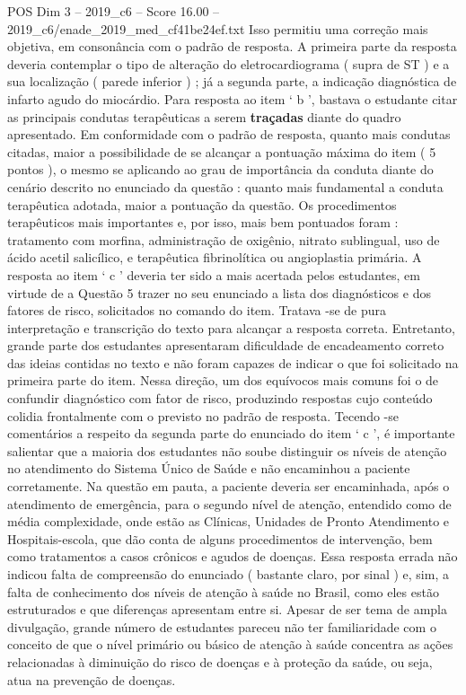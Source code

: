 \begin{textsample}{POS Dim 3 – 2019\_c6 – Score 16.00 – 2019\_c6/enade\_2019\_med\_cf41be24ef.txt}
Isso permitiu uma correção mais objetiva, em consonância com o padrão de resposta.
A primeira parte da resposta deveria contemplar o tipo de alteração do eletrocardiograma ( supra de ST ) e a sua localização ( parede inferior ) ; já a segunda parte, a indicação diagnóstica de infarto agudo do miocárdio.
Para resposta ao item ‘ b ’, bastava o estudante citar as principais condutas terapêuticas a serem \textbf{traçadas} diante do quadro apresentado.
Em conformidade com o padrão de resposta, quanto mais condutas citadas, maior a possibilidade de se alcançar a pontuação máxima do item ( 5 pontos ), o mesmo se aplicando ao grau de importância da conduta diante do cenário descrito no enunciado da questão : quanto mais fundamental a conduta terapêutica adotada, maior a pontuação da questão.
Os procedimentos terapêuticos mais importantes e, por isso, mais bem pontuados foram : tratamento com morfina, administração de oxigênio, nitrato sublingual, uso de ácido acetil salicílico, e terapêutica fibrinolítica ou angioplastia primária.
A resposta ao item ‘ c ’ deveria ter sido a mais acertada pelos estudantes, em virtude de a Questão 5 trazer no seu enunciado a lista dos diagnósticos e dos fatores de risco, solicitados no comando do item.
Tratava -se de pura interpretação e transcrição do texto para alcançar a resposta correta.
Entretanto, grande parte dos estudantes apresentaram dificuldade de encadeamento correto das ideias contidas no texto e não foram capazes de indicar o que foi solicitado na primeira parte do item.
Nessa direção, um dos equívocos mais comuns foi o de confundir diagnóstico com fator de risco, produzindo respostas cujo conteúdo colidia frontalmente com o previsto no padrão de resposta.
Tecendo -se comentários a respeito da segunda parte do enunciado do item ‘ c ’, é importante salientar que a maioria dos estudantes não soube distinguir os níveis de atenção no atendimento do Sistema Único de Saúde e não encaminhou a paciente corretamente.
Na questão em pauta, a paciente deveria ser encaminhada, após o atendimento de emergência, para o segundo nível de atenção, entendido como de média complexidade, onde estão as Clínicas, Unidades de Pronto Atendimento e Hospitais-escola, que dão conta de alguns procedimentos de intervenção, bem como tratamentos a casos crônicos e agudos de doenças.
Essa resposta errada não indicou falta de compreensão do enunciado ( bastante claro, por sinal ) e, sim, a falta de conhecimento dos níveis de atenção à saúde no Brasil, como eles estão estruturados e que diferenças apresentam entre si.
Apesar de ser tema de ampla divulgação, grande número de estudantes pareceu não ter familiaridade com o conceito de que o nível primário ou básico de atenção à saúde concentra as ações relacionadas à diminuição do risco de doenças e à proteção da saúde, ou seja, atua na prevenção de doenças.

\end{textsample}
